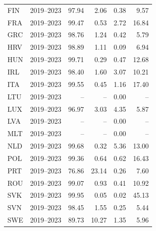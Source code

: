{\begin{longtable}{@{}lrrrrr@{}}
FIN & 2019–2023 & 97.94 &  2.06 &  0.38 &  9.57 \\
FRA & 2019–2023 & 99.47 &  0.53 &  2.72 & 16.84 \\
GRC & 2019–2023 & 98.76 &  1.24 &  0.42 &  5.79 \\
HRV & 2019–2023 & 98.89 &  1.11 &  0.09 &  6.94 \\
HUN & 2019–2023 & 99.71 &  0.29 &  0.47 & 12.68 \\
IRL & 2019–2023 & 98.40 &  1.60 &  3.07 & 10.21 \\
ITA & 2019–2023 & 99.55 &  0.45 &  1.16 & 17.40 \\
LTU & 2019–2023 & -- & -- &  0.00 & -- \\
LUX & 2019–2023 & 96.97 &  3.03 &  4.35 &  5.87 \\
LVA & 2019–2023 & -- & -- &  0.00 & -- \\
MLT & 2019–2023 & -- & -- &  0.00 & -- \\
NLD & 2019–2023 & 99.68 &  0.32 &  5.36 & 13.00 \\
POL & 2019–2023 & 99.36 &  0.64 &  0.62 & 16.43 \\
PRT & 2019–2023 & 76.86 & 23.14 &  0.26 &  7.60 \\
ROU & 2019–2023 & 99.07 &  0.93 &  0.41 & 10.92 \\
SVK & 2019–2023 & 99.95 &  0.05 &  0.02 & 45.13 \\
SVN & 2019–2023 & 98.45 &  1.55 &  0.25 &  5.44 \\
SWE & 2019–2023 & 89.73 & 10.27 &  1.35 &  5.96 \\
\end{longtable}
\par{}\par
}
